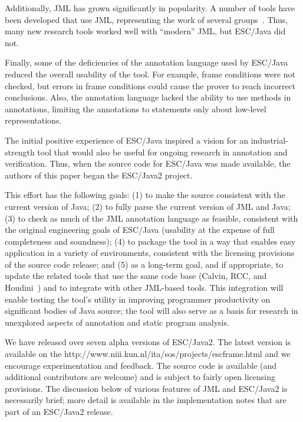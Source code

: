 \documentclass{llncs}
\begin{document}
Additionally, JML has grown significantly in popularity.  A number of
tools have been developed that use JML, representing the work of
several
groups~\cite{jmlpapers,Burdy-etal03,Leavens-etal00,NimmerErnst01,Bogor03}.
Thus, many new research tools worked well with ``modern'' JML, but
ESC/Java did not.

Finally, some of the deficiencies of the annotation language used by
ESC/Java reduced the overall usability of the tool.  For example,
frame conditions were not checked, but errors in frame conditions
could cause the prover to reach incorrect conclusions.  Also, the
annotation language lacked the ability to use methods in annotations,
limiting the annotations to statements only about low-level
representations.

The initial positive experience of ESC/Java inspired a vision for an
industrial-strength tool that would also be useful for ongoing
research in annotation and verification.  Thus, when the source code
for ESC/Java was made available, the authors of this paper began the
ESC/Java2 project.

This effort has the following goals:
(1) to make the source consistent with the current version of Java;
(2) to fully parse the current version of JML and Java;
(3) to check as much of the JML annotation language as feasible,
consistent with the original engineering goals of ESC/Java
(usability at the expense of full completeness and soundness);
(4) to package the tool in a way that enables easy application in a
variety of environments, consistent with the licensing provisions of
the source code release; and
(5) as a long-term goal, and if appropriate, to update the related
tools that use the same code base (Calvin, RCC, and
Houdini~\cite{flanagan01houdini}) and to integrate with other
JML-based tools.  This integration will enable testing the tool's
utility in improving programmer productivity on significant bodies of
Java source; the tool will also serve as a basis for research in
unexplored aspects of annotation and static program analysis.
  
We have released over seven alpha versions of ESC/Java2.  The latest
version is available on the 
{http://www.niii.kun.nl/ita/sos/projects/escframe.html} and we
encourage experimentation and feedback.  The source code is available
(and additional contributors are welcome) and is subject to fairly
open licensing provisions.  The discussion below of various features
of JML and ESC/Java2 is necessarily brief; more detail is available in
the implementation notes that are part of an ESC/Java2 release.
\end{document}
